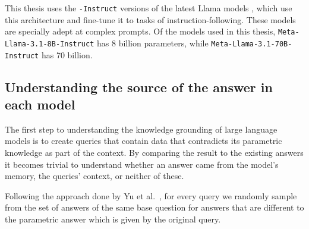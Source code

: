 This thesis uses the \texttt{-Instruct} versions of the latest Llama models \cite{llama3}, which use this architecture and fine-tune it to tasks of instruction-following.
These models are specially adept at complex prompts.
Of the models used in this thesis, \texttt{Meta-Llama-3.1-8B-Instruct} has 8 billion parameters, while \texttt{Meta-Llama-3.1-70B-Instruct} has 70 billion.

% 

\subsection{Understanding the source of the answer in each model}
\label{query_design}


The first step to understanding the knowledge grounding of large language models is to create queries that contain data that contradicts its parametric knowledge as part of the context.
By comparing the result to the existing answers it becomes trivial to understand whether an answer came from the model's memory, the queries' context, or neither of these.

Following the approach done by Yu et al.\ \cite{factual_recall}, for every query we randomly sample from the set of answers of the same base question for answers that are different to the parametric answer which is given by the original query.

